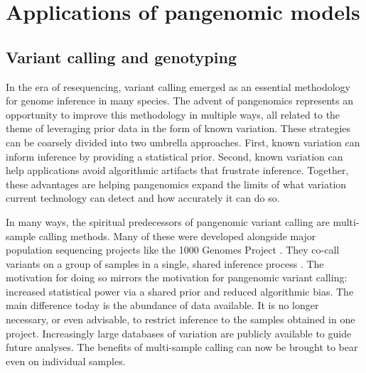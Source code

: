 \section{Applications of pangenomic models}

%

\subsection{Variant calling and genotyping}


In the era of resequencing, variant calling emerged as an essential methodology for genome inference in many species.
The advent of pangenomics represents an opportunity to improve this methodology in multiple ways, all related to the theme of leveraging prior data in the form of known variation.
These strategies can be coarsely divided into two umbrella approaches.
First, known variation can inform inference by providing a statistical prior.
Second, known variation can help applications avoid algorithmic artifacts that frustrate inference.
Together, these advantages are helping pangenomics expand the limits of what variation current technology can detect and how accurately it can do so.

In many ways, the spiritual predecessors of pangenomic variant calling are multi-sample calling methods. 
Many of these were developed alongside major population sequencing projects like the 1000 Genomes Project \cite{1000_2015}.
They co-call variants on a group of samples in a single, shared inference process \cite{Li_2011,Garrison_2012}.
The motivation for doing so mirrors the motivation for pangenomic variant calling: increased statistical power via a shared prior and reduced algorithmic bias.
The main difference today is the abundance of data available.
It is no longer necessary, or even advisable, to restrict inference to the samples obtained in one project.
Increasingly large databases of variation are publicly available to guide future analyses.
The benefits of multi-sample calling can now be brought to bear even on individual samples.


